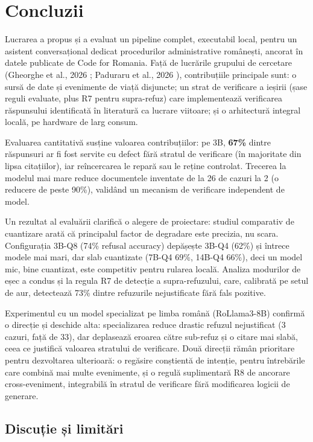 \chapter{Concluzii}

Lucrarea a propus și a evaluat un pipeline complet, executabil local, pentru un asistent conversațional dedicat procedurilor administrative românești, ancorat în datele publicate de Code for Romania. Față de lucrările grupului de cercetare (Gheorghe et al., 2026 \cite{gheorghe2026robust}; Paduraru et al., 2026 \cite{paduraru2026guardrail}), contribuțiile principale sunt: o sursă de date și evenimente de viață disjuncte; un strat de verificare a ieșirii (șase reguli evaluate, plus R7 pentru supra-refuz) care implementează verificarea răspunsului identificată în literatură ca lucrare viitoare; și o arhitectură integral locală, pe hardware de larg consum.

Evaluarea cantitativă susține valoarea contribuțiilor: pe 3B, \textbf{67\%} dintre răspunsuri ar fi fost servite cu defect fără stratul de verificare (în majoritate din lipsa citațiilor), iar reîncercarea le repară sau le reține controlat. Trecerea la modelul mai mare reduce documentele inventate de la 26 de cazuri la 2 (o reducere de peste 90\%), validând un mecanism de verificare independent de model.

Un rezultat al evaluării clarifică o alegere de proiectare: studiul comparativ de cuantizare arată că principalul factor de degradare este precizia, nu scara. Configurația 3B-Q8 (74\% refusal accuracy) depășește 3B-Q4 (62\%) și întrece modele mai mari, dar slab cuantizate (7B-Q4 69\%, 14B-Q4 66\%), deci un model mic, bine cuantizat, este competitiv pentru rularea locală. Analiza modurilor de eșec a condus și la regula R7 de detecție a supra-refuzului, care, calibrată pe setul de aur, detectează 73\% dintre refuzurile nejustificate fără fals pozitive.

Experimentul cu un model specializat pe limba română (RoLlama3-8B) confirmă o direcție și deschide alta: specializarea reduce drastic refuzul nejustificat (3 cazuri, față de 33), dar deplasează eroarea către sub-refuz și o citare mai slabă, ceea ce justifică valoarea stratului de verificare. Două direcții rămân prioritare pentru dezvoltarea ulterioară: o regăsire conștientă de intenție, pentru întrebările care combină mai multe evenimente, și o regulă suplimentară R8 de ancorare cross-eveniment, integrabilă în stratul de verificare fără modificarea logicii de generare.

\section{Discuție și limitări}
\label{sec:limitari}

